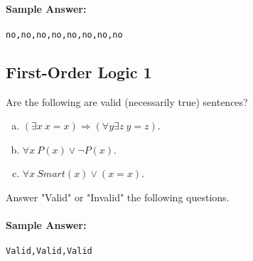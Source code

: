\documentclass[11pt, answers]{exam}
\begin{document}
\begin{questions}
\paragraph{Sample Answer:}
\begin{verbatim}
no,no,no,no,no,no,no,no
\end{verbatim}
\end{questions}


%
%
\begin{questions}
\section{First-Order Logic 1}
\question

Are the following are valid (necessarily true) sentences?

\begin{enumerate}[a.]
\item $(\exists x\ x=x) \Rightarrow (\forall y \exists z\ y =z)$.
\item $\forall x\ P(x) \vee \neg P(x)$. 
\item $\forall x\ Smart(x)\vee (x=x)$.
\end{enumerate}

Answer "Valid" or "Invalid" the following questions.

\paragraph{Sample Answer:}
\begin{verbatim}
Valid,Valid,Valid
\end{verbatim}
\end{questions}
\end{document}
